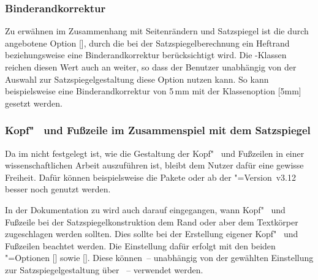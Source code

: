 \documentclass[%
  english,ngerman,%
  headings=optiontoheadandtoc,captions=tableheading,numbers=noenddot,%
  chapterpage,cdfoot,%
]{tudscrman}
\begin{document}
\subsubsection{Binderandkorrektur}
%
Zu erwähnen im Zusammenhang mit Seitenrändern und Satzspiegel ist die durch 
 angebotene Option [], durch 
die bei der Satzspiegelberechnung ein Heftrand beziehungsweise eine 
Binderandkorrektur berücksichtigt wird. Die \TUDScript-Klassen reichen diesen 
Wert auch an  weiter, so dass der Benutzer unabhängig von der 
Auswahl zur Satzspiegelgestaltung diese Option nutzen kann. So kann 
beispielsweise eine Binderandkorrektur von 5\,mm  mit der Klassenoption 
[5mm] gesetzt werden.

\subsubsection{Kopf"~ und Fußzeile im Zusammenspiel mit dem Satzspiegel}
%
%
Da im \CD nicht festgelegt ist, wie die Gestaltung der Kopf"~ und Fußzeilen in 
einer wissenschaftlichen Arbeit auszuführen ist, bleibt dem Nutzer dafür eine 
gewisse Freiheit. Dafür können beispielsweise die Pakete  oder 
ab der \KOMAScript"=Version~v3.12 besser noch  genutzt 
werden. 

In der Dokumentation zu  wird auch darauf eingegangen, wann 
Kopf"~ und Fußzeile bei der Satzspiegelkonstruktion dem Rand oder aber dem 
Textkörper zugeschlagen werden sollten. Dies sollte bei der Erstellung eigener 
Kopf"~ und Fußzeilen beachtet werden. Die Einstellung dafür erfolgt mit den 
beiden \KOMAScript"=Optionen [\PBoolean] sowie 
[\PBoolean]. Diese können~-- unabhängig von der gewählten 
Einstellung zur Satzspiegelgestaltung über ~-- verwendet werden.
\end{document}
